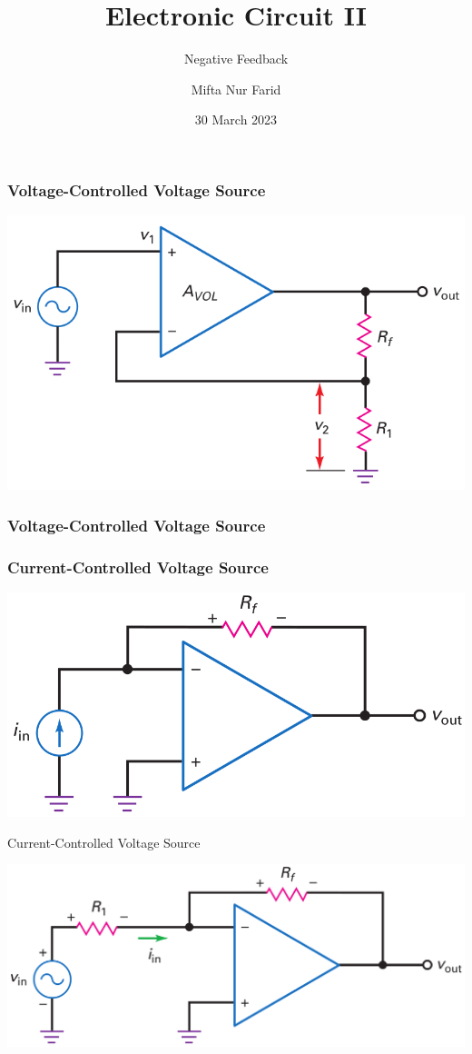 \documentclass[pdflatex,compress]{beamer}
\title{Electronic Circuit II}
\subtitle{Negative Feedback}
\author{Mifta Nur Farid}
\date{30 March 2023}
\begin{document}
\maketitle

\begin{frame}
	\frametitle{Voltage-Controlled Voltage Source}
	\begin{center}
		\includegraphics[width=0.9\linewidth]{img/Figure-17-3}
	\end{center}
\end{frame}

\begin{frame}\frametitle{Voltage-Controlled Voltage Source}

\end{frame}

\begin{frame}
	\frametitle{Current-Controlled Voltage Source}
	\begin{center}
		\includegraphics[width=0.9\linewidth]{img/Figure-17-7}
	\end{center}
\end{frame}

\begin{frame}{Current-Controlled Voltage Source}
	\begin{center}
		\includegraphics[width=0.9\linewidth]{img/Figure-17-8}
	\end{center}
\end{frame}
\end{document}

